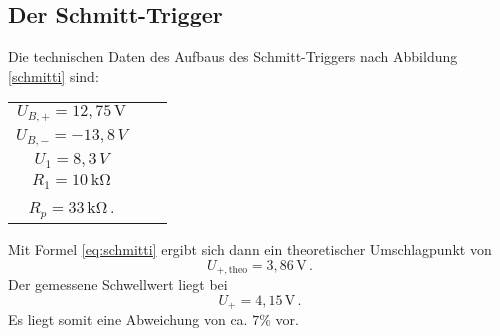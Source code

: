 \subsection{Der Schmitt-Trigger}
Die technischen Daten des Aufbaus des Schmitt-Triggers nach Abbildung \ref{schmitti} sind:
\begin{table}[H]
\centering
\begin{tabular}{ccc}
$U_{B,+}=12{,}75 \,\si{\V}$ \\
$U_{B,-}=-13{,}8\,\si{V}$ \\
$U_1=8{,}3\,\si{V}$ \\
$R_1=10\,\si{\kilo\ohm}$ \\
$R_p=33\,\si{\kilo\ohm}$\,. \\
\end{tabular}
\end{table}
Mit Formel \eqref{eq:schmitti} ergibt sich dann ein theoretischer Umschlagpunkt von
\begin{equation}
U_{+,\text{theo}}=3{,}86\,\si{\V}\,.
\end{equation}
Der gemessene Schwellwert liegt bei
\begin{equation}
U_{+}=4{,}15\,\si{\V}\,.
\end{equation}
Es liegt somit eine Abweichung von ca. $7\%$ vor.
\clearpage
